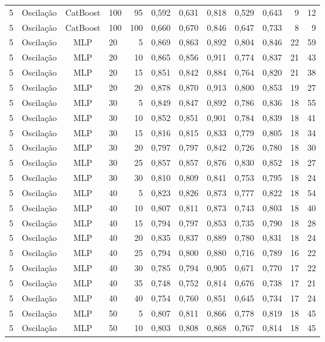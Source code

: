 \begin{longtable}{ccclrrrrrrrr}
5 & Oscilação & CatBoost & 100 & 95 & 0,592 & 0,631 & 0,818 & 0,529 & 0,643 & 9 & 12 \\
5 & Oscilação & CatBoost & 100 & 100 & 0,660 & 0,670 & 0,846 & 0,647 & 0,733 & 8 & 9 \\
5 & Oscilação & MLP & 20 & 5 & 0,869 & 0,863 & 0,892 & 0,804 & 0,846 & 22 & 59 \\
5 & Oscilação & MLP & 20 & 10 & 0,865 & 0,856 & 0,911 & 0,774 & 0,837 & 21 & 43 \\
5 & Oscilação & MLP & 20 & 15 & 0,851 & 0,842 & 0,884 & 0,764 & 0,820 & 21 & 38 \\
5 & Oscilação & MLP & 20 & 20 & 0,878 & 0,870 & 0,913 & 0,800 & 0,853 & 19 & 27 \\
5 & Oscilação & MLP & 30 & 5 & 0,849 & 0,847 & 0,892 & 0,786 & 0,836 & 18 & 55 \\
5 & Oscilação & MLP & 30 & 10 & 0,852 & 0,851 & 0,901 & 0,784 & 0,839 & 18 & 41 \\
5 & Oscilação & MLP & 30 & 15 & 0,816 & 0,815 & 0,833 & 0,779 & 0,805 & 18 & 34 \\
5 & Oscilação & MLP & 30 & 20 & 0,797 & 0,797 & 0,842 & 0,726 & 0,780 & 18 & 30 \\
5 & Oscilação & MLP & 30 & 25 & 0,857 & 0,857 & 0,876 & 0,830 & 0,852 & 18 & 27 \\
5 & Oscilação & MLP & 30 & 30 & 0,810 & 0,809 & 0,841 & 0,753 & 0,795 & 18 & 24 \\
5 & Oscilação & MLP & 40 & 5 & 0,823 & 0,826 & 0,873 & 0,777 & 0,822 & 18 & 54 \\
5 & Oscilação & MLP & 40 & 10 & 0,807 & 0,811 & 0,873 & 0,743 & 0,803 & 18 & 40 \\
5 & Oscilação & MLP & 40 & 15 & 0,794 & 0,797 & 0,853 & 0,735 & 0,790 & 18 & 28 \\
5 & Oscilação & MLP & 40 & 20 & 0,835 & 0,837 & 0,889 & 0,780 & 0,831 & 18 & 24 \\
5 & Oscilação & MLP & 40 & 25 & 0,794 & 0,800 & 0,880 & 0,716 & 0,789 & 16 & 22 \\
5 & Oscilação & MLP & 40 & 30 & 0,785 & 0,794 & 0,905 & 0,671 & 0,770 & 17 & 22 \\
5 & Oscilação & MLP & 40 & 35 & 0,748 & 0,752 & 0,814 & 0,676 & 0,738 & 17 & 21 \\
5 & Oscilação & MLP & 40 & 40 & 0,754 & 0,760 & 0,851 & 0,645 & 0,734 & 17 & 24 \\
5 & Oscilação & MLP & 50 & 5 & 0,807 & 0,811 & 0,866 & 0,778 & 0,819 & 18 & 45 \\
5 & Oscilação & MLP & 50 & 10 & 0,803 & 0,808 & 0,868 & 0,767 & 0,814 & 18 & 45 \\

\end{longtable}
